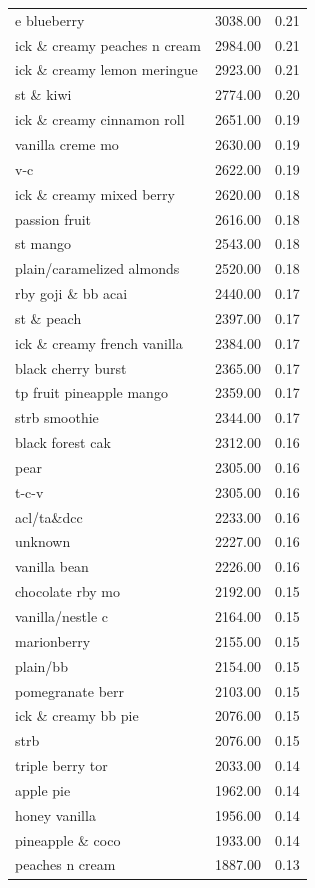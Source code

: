 \begin{table}
\begin{tabular}{lrr}
e blueberry & 3038.00 & 0.21 \\
ick \& creamy peaches n cream & 2984.00 & 0.21 \\
ick \& creamy lemon meringue & 2923.00 & 0.21 \\
st \& kiwi & 2774.00 & 0.20 \\
ick \& creamy cinnamon roll & 2651.00 & 0.19 \\
vanilla creme mo & 2630.00 & 0.19 \\
v-c & 2622.00 & 0.19 \\
ick \& creamy mixed berry & 2620.00 & 0.18 \\
passion fruit & 2616.00 & 0.18 \\
st mango & 2543.00 & 0.18 \\
plain/caramelized almonds & 2520.00 & 0.18 \\
rby goji \& bb acai & 2440.00 & 0.17 \\
st \& peach & 2397.00 & 0.17 \\
ick \& creamy french vanilla & 2384.00 & 0.17 \\
black cherry burst & 2365.00 & 0.17 \\
tp fruit pineapple mango & 2359.00 & 0.17 \\
strb smoothie & 2344.00 & 0.17 \\
black forest cak & 2312.00 & 0.16 \\
pear & 2305.00 & 0.16 \\
t-c-v & 2305.00 & 0.16 \\
acl/ta\&dcc & 2233.00 & 0.16 \\
unknown & 2227.00 & 0.16 \\
vanilla bean & 2226.00 & 0.16 \\
chocolate rby mo & 2192.00 & 0.15 \\
vanilla/nestle c & 2164.00 & 0.15 \\
marionberry & 2155.00 & 0.15 \\
plain/bb & 2154.00 & 0.15 \\
pomegranate berr & 2103.00 & 0.15 \\
ick \& creamy bb pie & 2076.00 & 0.15 \\
strb & 2076.00 & 0.15 \\
triple berry tor & 2033.00 & 0.14 \\
apple pie & 1962.00 & 0.14 \\
honey vanilla & 1956.00 & 0.14 \\
pineapple \& coco & 1933.00 & 0.14 \\
peaches n cream & 1887.00 & 0.13 \\

\end{tabular}
\end{table}
